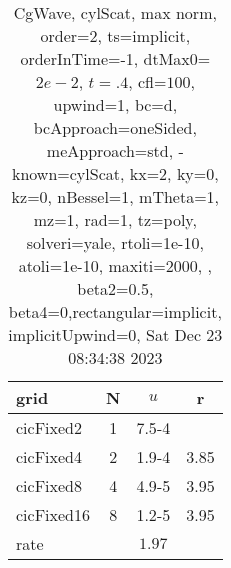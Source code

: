 \begin{table}[H]\tableFont %
\begin{center}
\begin{tabular}{|l|c|c|c|} \hline 
grid  & N &  $ u $ & r \\ \hline 
 cicFixed2 &     1 & \num{7.5}{-4} &        \\ \hline
 cicFixed4 &     2 & \num{1.9}{-4} &  3.85  \\ \hline
 cicFixed8 &     4 & \num{4.9}{-5} &  3.95  \\ \hline
cicFixed16 &     8 & \num{1.2}{-5} &  3.95  \\ \hline
    rate             &       &  $1.97$       &       \\ \hline
\end{tabular}
\caption{CgWave, cylScat, max norm, order=$2$, ts=implicit, orderInTime=-1, dtMax0=$2e-2$, $t=.4$, cfl=$100$, upwind=1, bc=d, bcApproach=oneSided, meApproach=std, -known=cylScat, kx=2, ky=0, kz=0, nBessel=1, mTheta=1, mz=1, rad=1, tz=poly, solveri=yale, rtoli=1e-10, atoli=1e-10, maxiti=2000, , beta2=0.5, beta4=0,rectangular=implicit, implicitUpwind=0, Sat Dec 23 08:34:38 2023}\label{table:cylScatOrder2max}
\end{center}
\end{table}
